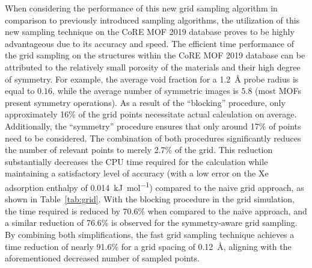 \documentclass[main]{subfiles}
\begin{document}
When considering the performance of this new grid sampling algorithm in comparison to previously introduced sampling algorithms, the utilization of this new sampling technique on the CoRE MOF 2019 database proves to be highly advantageous due to its accuracy and speed. The efficient time performance of the grid sampling on the structures within the CoRE MOF 2019 database can be attributed to the relatively small porosity of the materials and their high degree of symmetry. For example, the average void fraction for a \SI{1.2}{\angstrom} probe radius is equal to $0.16$, while the average number of symmetric images is $5.8$ (most MOFs present symmetry operations). As a result of the ``blocking'' procedure, only approximately {16\%} of the grid points necessitate actual calculation on average. Additionally, the ``symmetry'' procedure ensures that only around {17\%} of points need to be considered. The combination of both procedures significantly reduces the number of relevant points to merely {2.7\%} of the grid. This reduction substantially decreases the CPU time required for the calculation while maintaining a satisfactory level of accuracy (with a low error on the Xe adsorption enthalpy of \SI{0.014}{\kilo\joule\per\mole}) compared to the naive grid approach, as shown in Table~\ref{tab:grid}. With the blocking procedure in the grid simulation, the time required is reduced by {70.6\%} when compared to the naive approach, and a similar reduction of {76.6\%} is observed for the symmetry-aware grid sampling. By combining both simplifications, the fast grid sampling technique achieves a time reduction of nearly {91.6\%} for a grid spacing of \SI{0.12}{\angstrom}, aligning with the aforementioned decreased number of sampled points.
\end{document}
